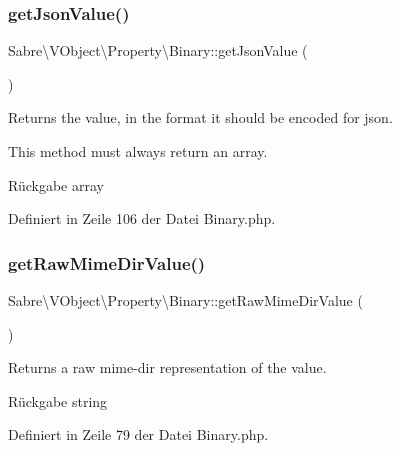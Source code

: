 \subsubsection{\texorpdfstring{get\+Json\+Value()}{getJsonValue()}}
{\footnotesize\ttfamily Sabre\textbackslash{}\+V\+Object\textbackslash{}\+Property\textbackslash{}\+Binary\+::get\+Json\+Value (\begin{DoxyParamCaption}{ }\end{DoxyParamCaption})}

Returns the value, in the format it should be encoded for json.

This method must always return an array.

\begin{DoxyReturn}{Rückgabe}
array 
\end{DoxyReturn}


Definiert in Zeile 106 der Datei Binary.\+php.

\mbox{\label{class_sabre_1_1_v_object_1_1_property_1_1_binary_a03c7f7e0a75e521e5484e0be7c29ef92}} 
\subsubsection{\texorpdfstring{get\+Raw\+Mime\+Dir\+Value()}{getRawMimeDirValue()}}
{\footnotesize\ttfamily Sabre\textbackslash{}\+V\+Object\textbackslash{}\+Property\textbackslash{}\+Binary\+::get\+Raw\+Mime\+Dir\+Value (\begin{DoxyParamCaption}{ }\end{DoxyParamCaption})}

Returns a raw mime-\/dir representation of the value.

\begin{DoxyReturn}{Rückgabe}
string 
\end{DoxyReturn}


Definiert in Zeile 79 der Datei Binary.\+php.

\mbox{\label{class_sabre_1_1_v_object_1_1_property_1_1_binary_ad868ea901d8b934c7a8209a9b4830849}} 
